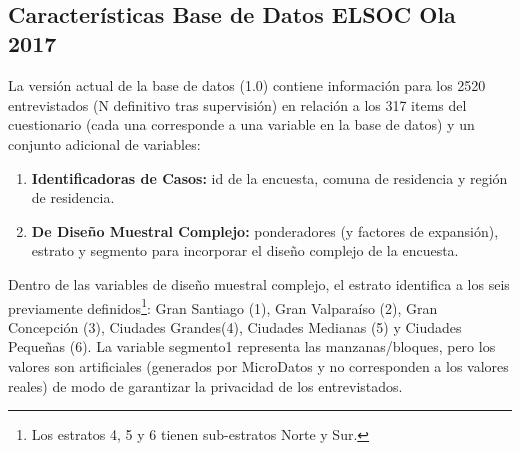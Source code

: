 \documentclass[12pt]{report}
\begin{document}
\noindent {}
\vspace{0.1cm}\\

\subsection*{Características Base de Datos ELSOC Ola 2017}

La versión actual de la base de datos (1.0) contiene información 
para los 2520 entrevistados (N definitivo tras supervisión) en relación a los 317 items del cuestionario (cada una corresponde a una variable en la base de datos) y un conjunto adicional de variables:

\begin{enumerate}
	\item \textbf{Identificadoras de Casos:} id de la encuesta, comuna de residencia y región de residencia. 
	\item \textbf{De Diseño Muestral Complejo:} ponderadores (y factores de expansión), estrato y segmento para incorporar el diseño complejo de la encuesta. 
\end{enumerate}

Dentro de las variables de diseño muestral complejo, el estrato identifica a los seis previamente definidos\footnote{Los estratos 4, 5 y 6 tienen sub-estratos Norte y Sur.}: Gran Santiago (1), Gran Valparaíso (2), Gran Concepción (3), Ciudades Grandes(4), Ciudades Medianas (5) y Ciudades Pequeñas (6). La variable segmento1 representa las manzanas/bloques, pero los valores son artificiales (generados por MicroDatos y no corresponden a los valores reales) de modo de garantizar la privacidad de los entrevistados.\\
\end{document}
